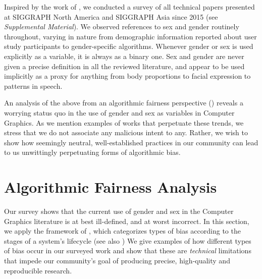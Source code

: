 \documentclass[nonacm,sigconf,review,balance=false]{acmart}
\begin{document}

Inspired by the work of \citet{keyes2018misgendering}, we conducted a survey of
all technical papers presented at SIGGRAPH North America and SIGGRAPH Asia since
2015 (see \emph{Supplemental Material}). We observed references to sex and gender routinely
throughout, varying in nature from demographic information reported about user
study participants to gender-specific algorithms. Whenever gender or sex is used
explicitly as a variable, it is always as a binary one. Sex and gender are never given a precise definition in all the reviewed
literature, and appear to be used implicitly as a proxy for anything from body
proportions to facial expression to patterns in speech.

An analysis of the above from an algorithmic fairness perspective () reveals a worrying status quo in the use of gender and sex
as variables in Computer Graphics. As we
mention examples of works that perpetuate these trends, we stress that we do not
associate any malicious intent to any. Rather, we wish to show how seemingly
neutral, well-established practices in our community can lead to us unwittingly
perpetuating forms of algorithmic bias.

\vspace{-0.1cm}
\section{Algorithmic Fairness Analysis}\label{sec:analysis}

Our survey shows that the current use of gender and sex in the Computer Graphics literature is at best ill-defined, and at worst incorrect.
In this section,
we apply the framework of \citet{Suresh2021}, which categorizes types of bias according to the stages of a system's lifecycle 
(see also \cite{fairnesssurvey,FriedmanAndNissenbaum,olteanu2019social})
We give examples of how different types of bias occur in our surveyed work and show that these are \emph{technical} limitations that impede our community's goal of producing precise, high-quality and reproducible research.
\end{document}
